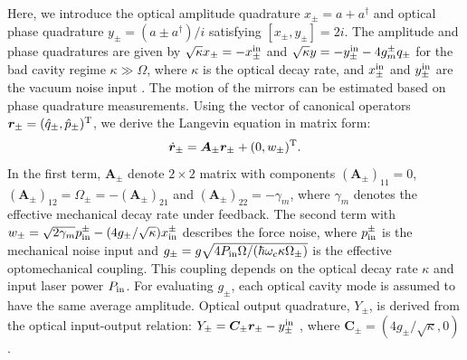 \documentclass[twocolumn,superscriptaddress,aps,preprintnumbers,amsmath,amssymb,prl,nofootinbib]{revtex4}
\begin{document}
Here, we introduce the optical amplitude quadrature $x_{\pm}=a+a^\dagger$ and optical phase quadrature $y_\pm=(a\pm a^\dagger)/i$ satisfying $[x_\pm,y_\pm]=2i$.
The amplitude and phase quadratures are given by $\sqrt{\kappa}x_\pm=-x_\pm^{\rm in}$ and $\sqrt{\kappa}y=-y_\pm^{\rm in}-4g_m^\pm q_\pm$ for the bad cavity regime $\kappa\gg\Omega$, where $\kappa$ is the optical decay rate, and $x_\pm^{\rm in}$ and $y_\pm^{\rm in}$ are the vacuum noise input \cite{Bowen}.
The motion of the mirrors can be estimated based on phase quadrature measurements.
Using the vector of canonical operators $\bm{r}_\pm=(\hat{q}_\pm,\hat{p}_\pm)^{\rm T}$,
we derive the Langevin equation in matrix form:
\begin{equation}
\dot{\bm{r}}_\pm =\bm{A}_\pm\bm{r}_\pm
+(0,w_\pm)^{\rm T}.
\end{equation}
In the first term, 
$\bm{A}_\pm$ denote 
$2\times 2$ matrix with components 
$(\bm{A}_\pm)_{11}=0$, 
$(\bm{A}_\pm)_{12}=\Omega_\pm=-(\bm{A}_\pm)_{21}$ and 
$(\bm{A}_\pm)_{22}=-\gamma_m$, where $\gamma_m$ denotes the effective mechanical decay rate under feedback.  
The second term with 
$ w_\pm=\sqrt{2\gamma_{m}}p_{\rm in}^\pm -(4g_\pm/\sqrt{\kappa})x_{\text{in}}^\pm$
describes the force noise, where  $p_{\rm in}^\pm$ is the mechanical noise input and $g_\pm=g\sqrt{4P_{\rm in} \Omega /(\hbar\omega_c\kappa \Omega_\pm)}$ is the effective optomechanical coupling. 
This coupling depends on the optical decay rate $\kappa$
and input laser power 
$P_{\rm in}$. 
For evaluating 
$g_\pm$, each optical cavity mode is assumed to have the same average amplitude. 
Optical output quadrature, $Y_\pm$,
is  derived from the optical input-output relation: 
$Y_\pm =\bm{C}_{\pm}\bm{r}_\pm-y^{\rm in}_{\pm}$
, where 
$\bm{C}_\pm= (4g_\pm/\sqrt{\kappa},0)$.
\end{document}
